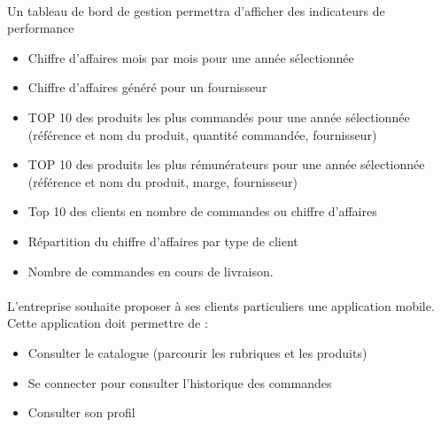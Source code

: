 \documentclass{article}
\begin{document}
\paragraph{}
Un tableau de bord de gestion permettra d'afficher des indicateurs de performance
\begin{itemize}
  \item Chiffre d'affaires mois par mois pour une année sélectionnée
  \item Chiffre d'affaires généré pour un fournisseur
  \item TOP 10 des produits les plus commandés pour une année sélectionnée (référence et nom du produit, quantité commandée, fournisseur)
  \item TOP 10 des produits les plus rémunérateurs pour une année sélectionnée (référence et nom du produit, marge, fournisseur)
  \item Top 10 des clients en nombre de commandes ou chiffre d'affaires
  \item Répartition du chiffre d'affaires par type de client
  \item Nombre de commandes en cours de livraison.
\end{itemize}
\par
\paragraph{}
L'entreprise souhaite proposer à ses clients particuliers une application mobile. Cette application doit permettre de :
\begin{itemize}
  \item Consulter le catalogue (parcourir les rubriques et les produits)
  \item Se connecter pour consulter l'historique des commandes
  \item Consulter son profil
\end{itemize}
\par
\end{document}
